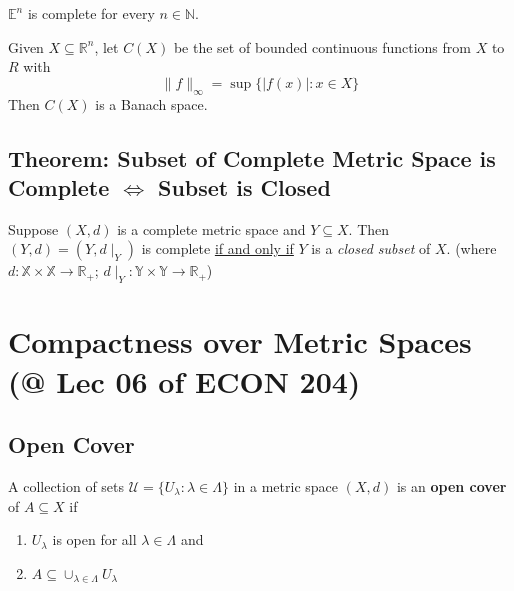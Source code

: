 \documentclass[11pt]{elegantbook}
\begin{document}
\begin{theorem}
    $\mathbb{E}^n$ is complete for every $n \in \mathbb{N}$.
\end{theorem}

\begin{theorem}
    Given $X \subseteq \mathbb{R}^n$, let $C(X)$ be the set of bounded continuous
    functions from $X$ to $R$ with $$\|f\|_\infty=\sup\{|f(x)|:x\in X\}$$
    Then $C(X)$ is a Banach space.
\end{theorem}

\subsection{Theorem: Subset of Complete Metric Space is Complete $\Leftrightarrow$ Subset is Closed}
\begin{theorem}\label{complete_equal_closed}
    Suppose $(X, d)$ is a complete metric space and $Y \subseteq X$. Then $(Y, d) = (Y, d\mid_Y)$ is complete \underline{if and only if} $Y$ is a \textit{closed subset} of $X$. (where $d: \mathbb{X}\times \mathbb{X}\rightarrow \mathbb{R}_+$; $d\mid_Y: \mathbb{Y}\times \mathbb{Y}\rightarrow \mathbb{R}_+$)
\end{theorem}


\section{Compactness over Metric Spaces \small{(@ Lec 06 of ECON 204)}}
\subsection{Open Cover}
\begin{definition}
    \normalfont
    A collection of sets $\mathcal{U} = \{U_\lambda : \lambda \in \Lambda\}$ in a metric space $(X, d)$ is an \textbf{open cover} of $A\subseteq X$ if
    \begin{enumerate}
        \item $U_\lambda$ is open for all $\lambda \in \Lambda$ and
        \item $A\subseteq \cup_{\lambda\in\Lambda}U_\lambda$
    \end{enumerate}
\end{definition}
\end{document}
